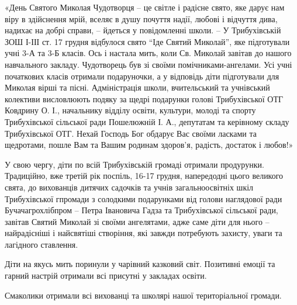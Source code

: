
«День Святого Миколая Чудотворця – це світле і радісне свято, яке дарує нам
віру в здійснення мрій, вселяє в душу почуття надії, любові і відчуття дива,
надихає на добрі справи, – йдеться у повідомленні школи. – У Трибухівській ЗОШ
І-ІІІ ст. 17 грудня відбулося свято \enquote{Іде Святий Миколай}, яке підготували учні
3-А та 3-Б класів. Ось і настала мить, коли Св. Миколай завітав до нашого
навчального закладу. Чудотворець був зі своїми помічниками-ангелами. Усі учні
початкових класів отримали подаруночки, а у відповідь діти підготували для
Миколая вірші та пісні. Адміністрація школи, вчительський та учнівський
колективи висловлюють подяку за щедрі подарунки голові Трибухівської ОТГ
Ковдрину О. І., начальнику відділу освіти, культури, молоді та спорту
Трибухівської сільської ради Пошелюжній І. А., депутатам та керівному складу
Трибухівської ОТГ. Нехай Господь Бог обдарує Вас своїми ласками та щедротами,
пошле Вам та Вашим родинам здоров’я, радість, достаток і любов!»


У свою чергу, діти по всій Трибухівській громаді отримали продурунки.
Традиційно, вже третій рік поспіль, 16-17 грудня, напередодні цього великого
свята, до вихованців дитячих садочків та учнів загальноосвітніх шкіл
Трибухівської гпромади з солодкими подарунками від голови наглядової ради
Бучачагрохлібпром – Петра Івановича Гадза та Трибухівської сільської ради,
завітав Святий Миколай зі своїми ангелятами, адже саме діти для нього –
найрадісніші і найсвятіші створіння, які завжди потребують захисту, уваги та
лагідного ставлення.


Діти на якусь мить поринули у чарівний казковий світ. Позитивні емоції та
гарний настрій отримали всі присутні у закладах освіти.

Смаколики отримали всі вихованці та школярі нашої територіальної громади.

